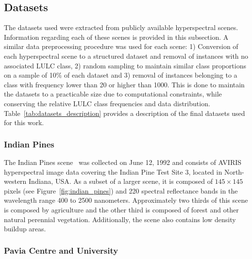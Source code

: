 \documentclass[parskip=full]{scrartcl}
\begin{document}
\subsection{Datasets}

The datasets used were extracted from publicly available hyperspectral scenes.
Information regarding each of these scenes is provided in this subsection. A
similar data preprocessing procedure was used for each scene: 1) Conversion of
each hyperspectral scene to a structured dataset and removal of instances with
no associated LULC class, 2) random sampling to maintain similar class
proportions on a sample of 10\% of each dataset and 3) removal of instances
belonging to a class with frequency lower than 20 or higher than 1000. This is
done to maintain the datasets to a practicable size due to computational
constraints, while conserving the relative LULC class frequencies and data
distribution. Table~\ref{tab:datasets_description} provides a description of the
final datasets used for this work.


\subsubsection*{Indian Pines} 

The Indian Pines scene~\cite{Baumgardner2015} was collected on June 12, 1992 and
consists of AVIRIS hyperspectral image data covering the Indian Pine Test Site
3, located in North-western Indiana, USA. As a subset of a larger scene, it is
composed of $145 \times 145$ pixels (see Figure~\ref{fig:indian_pines}) and 220
spectral reflectance bands in the wavelength range 400 to 2500 nanometers.
Approximately two thirds of this scene is composed by agriculture and the other
third is composed of forest and other natural perennial vegetation.
Additionally, the scene also contains low density buildup areas.

\subsubsection*{Pavia Centre and University}
\end{document}
